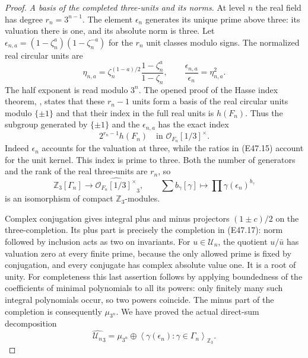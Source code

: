 \begin{proof}
\emph{A basis of the completed three-units and its norms.}
At level $n$ the real field has degree
$r_n=3^{n-1}$. The element $\epsilon_n$ generates
its unique prime above three: its valuation
there is one, and its absolute norm is three.
Let $\epsilon_{n,a}=(1-\zeta_n^a)(1-\zeta_n^{-a})$
for the $r_n$ unit classes modulo signs.
The normalized real circular units are
\[
 \eta_{n,a}=\zeta_n^{(1-a)/2}
                     \frac{1-\zeta_n^a}{1-\zeta_n},
 \qquad
              \frac{\epsilon_{n,a}}{\epsilon_n}
                         =\eta_{n,a}^2.
 \tag{E47.15}
\]
The half exponent is read modulo $3^n$.
The opened proof of the Hasse index theorem,
\cite[Theorem 4.3.3 and its proof, pp.~108--109]{E_SharifiCyclotomic},
states that these $r_n-1$ units form a basis
of the real circular units modulo $\{\pm1\}$
and that their index in the full real units
is $h(F_n)$. Thus the subgroup generated by
$\{\pm1\}$ and the $\epsilon_{n,a}$ has the
exact index
\[
       2^{r_n-1}h(F_n)
       \quad\text{in }\mathcal O_{F_n}[1/3]^\times.
 \tag{E47.16}
\]
Indeed $\epsilon_n$ accounts for the valuation
at three, while the ratios in (E47.15) account
for the unit kernel. This index is prime to
three. Both the number of generators and the
rank of the real three-units are $r_n$, so
\[
 \mathbb Z_3[\Gamma_n]\longrightarrow
       \widehat{\mathcal O_{F_n}[1/3]^\times}_3,
 \qquad\sum b_\gamma[\gamma]\longmapsto
                 \prod\gamma(\epsilon_n)^{b_\gamma}
 \tag{E47.17}
\]
is an isomorphism of compact $\mathbb Z_3$-modules.

Complex conjugation gives integral plus and
minus projectors $(1\pm c)/2$ on the
three-completion. Its plus part is precisely
the completion in (E47.17): norm followed by
inclusion acts as two on invariants. For
$u\in\mathcal U_n$, the quotient $u/\bar u$
has valuation zero at every finite prime,
because the only allowed prime is fixed by
conjugation, and every conjugate has complex
absolute value one. It is a root of unity.
For completeness this last assertion follows
by applying boundedness of the coefficients
of minimal polynomials to all its powers:
only finitely many such integral polynomials
occur, so two powers coincide. The minus
part of the completion is consequently
$\mu_{3^n}$. We have proved the actual
direct-sum decomposition
\[
 \widehat{\mathcal U_n}_3
       =\mu_{3^n}\oplus
         \left\langle\gamma(\epsilon_n):
                      \gamma\in\Gamma_n\right\rangle_{\mathbb Z_3}.
 \tag{E47.18}
\]


\end{proof}
